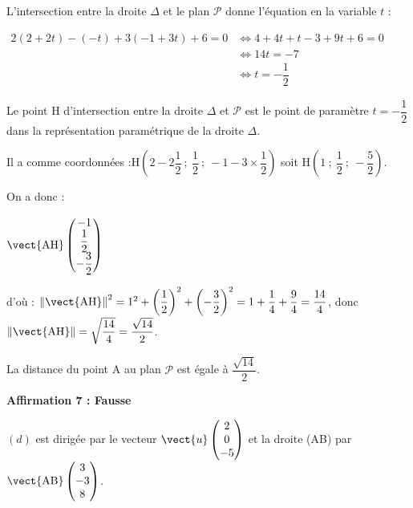 L'intersection entre la droite $\Delta$ et le plan $\mathcal{P}$ donne l'équation en la variable $t$ :

$\begin{aligned} 2(2+2t)- (-t)+3(-1+3t)+6=0 &\iff 4+4t+t-3+9t+6=0\\
	& \iff 14t=-7\\
	& \iff t=-\dfrac{1}{2}
\end{aligned}$

Le point H d'intersection entre la droite $\Delta$ et $\mathcal{P}$ est le point de paramètre  $ t=-\dfrac{1}{2}$ dans la représentation paramétrique de la droite $\Delta$.

Il a comme coordonnées :\quad$\mathrm{H}\left(2 -2 \dfrac{1}{2}~;~\dfrac{1}{2}~;~-1 - 3 \times\dfrac{1}{2}\right)$ soit $\mathrm{H}\left(1~;~\dfrac{1}{2}~;~-\dfrac{5}{2}\right)$.

On a donc :

$\vect{\mathrm{AH}}\begin{pmatrix}-1\\ \dfrac{1}{2}\\ -\dfrac{3}{2}\end{pmatrix}$

d'où : $\left\|\vect {\mathrm{AH}}\right\|^2=1^2+ \left(\dfrac{1}{2}\right)^2+\left(-\dfrac{3}{2}\right)^2=1+\dfrac{1}{4}+\dfrac{9}{4}=\dfrac{14}{4}$, donc $\left\|\vect {\mathrm{AH}}\right\|=\sqrt{\dfrac{14}{4}}=\dfrac{\sqrt{14}}{2}$.

La distance du point A au plan $\mathcal{P}$ est égale à $\dfrac{\sqrt{14}}{2}$.

\smallskip

%

\textbf{Affirmation 7 : Fausse}

$(d)$ est dirigée par le vecteur $\vect{u}\begin{pmatrix}2\\0\\-5\end{pmatrix}$ et la droite (AB) par $\vect{\mathrm{AB}}\begin{pmatrix}3 \\ -3\\8\end{pmatrix}$.

